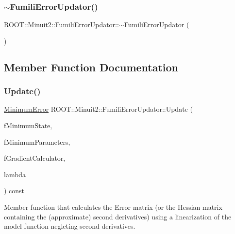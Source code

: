 \subsubsection{\texorpdfstring{$\sim$FumiliErrorUpdator()}{~FumiliErrorUpdator()}\hspace{0.1cm}{\footnotesize\ttfamily [2/2]}}
{\footnotesize\ttfamily R\+O\+O\+T\+::\+Minuit2\+::\+Fumili\+Error\+Updator\+::$\sim$\+Fumili\+Error\+Updator (\begin{DoxyParamCaption}{ }\end{DoxyParamCaption})\hspace{0.3cm}{\ttfamily [inline]}}



\subsection{Member Function Documentation}
\mbox{\label{classROOT_1_1Minuit2_1_1FumiliErrorUpdator_a56adeed7f507548e61a3563182f3caaf}} 
\subsubsection{\texorpdfstring{Update()}{Update()}\hspace{0.1cm}{\footnotesize\ttfamily [1/4]}}
{\footnotesize\ttfamily \mbox{\hyperlink{classROOT_1_1Minuit2_1_1MinimumError}{Minimum\+Error}} R\+O\+O\+T\+::\+Minuit2\+::\+Fumili\+Error\+Updator\+::\+Update (\begin{DoxyParamCaption}\item[{const \mbox{\hyperlink{classROOT_1_1Minuit2_1_1MinimumState}{Minimum\+State}} \&}]{f\+Minimum\+State,  }\item[{const \mbox{\hyperlink{classROOT_1_1Minuit2_1_1MinimumParameters}{Minimum\+Parameters}} \&}]{f\+Minimum\+Parameters,  }\item[{const \mbox{\hyperlink{classROOT_1_1Minuit2_1_1GradientCalculator}{Gradient\+Calculator}} \&}]{f\+Gradient\+Calculator,  }\item[{double}]{lambda }\end{DoxyParamCaption}) const\hspace{0.3cm}{\ttfamily [virtual]}}

Member function that calculates the Error matrix (or the Hessian matrix containing the (approximate) second derivatives) using a linearization of the model function negleting second derivatives.


